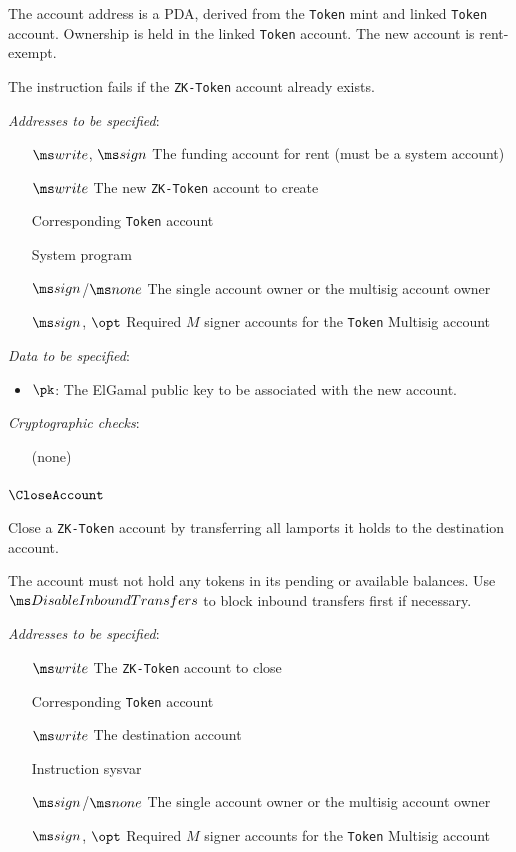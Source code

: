 The account address is a PDA, derived from the \texttt{Token} mint and linked
\texttt{Token} account. Ownership is held in the linked \texttt{Token} account.
The new account is rent-exempt.

The instruction fails if the \texttt{ZK-Token} account already exists.

\vspace{0.5em}

\textit{Addresses to be specified}:
\begin{itemize}[leftmargin=2.5cm]
  \item[$\writable$, $\signer$] The funding account for rent (must be a system
    account)
  \item[$\writable$] The new \texttt{ZK-Token} account to create
  \item[] Corresponding \texttt{Token} account
  \item[] System program
  \item[$\signer$/$\none$] The single account owner or the multisig account owner
  \item[$\signer$, $\opt$]  Required $M$ signer accounts for the \texttt{Token}
    Multisig account
\end{itemize}

\noindent
\textit{Data to be specified}:
\begin{itemize}
  \item $\pk$: The ElGamal public key to be associated with the new account.
\end{itemize}

\noindent
\textit{Cryptographic checks}:
\begin{itemize}
  \item[] (none)
\end{itemize}


\newpage
\subsubsection{$\CloseAccount$}
Close a \texttt{ZK-Token} account by transferring all lamports it holds to the
destination account.

The account must not hold any tokens in its pending or available
balances. Use $\DisableInboundTransfers$ to block inbound transfers first if
necessary.

\vspace{0.5em}

\textit{Addresses to be specified}:
\begin{itemize}[leftmargin=2.5cm]
  \item[$\writable$] The \texttt{ZK-Token} account to close
  \item[] Corresponding \texttt{Token} account
  \item[$\writable$] The destination account
  \item[] Instruction sysvar
  \item[$\signer$/$\none$] The single account owner or the multisig account owner
  \item[$\signer$, $\opt$]  Required $M$ signer accounts for the \texttt{Token}
    Multisig account
\end{itemize}


